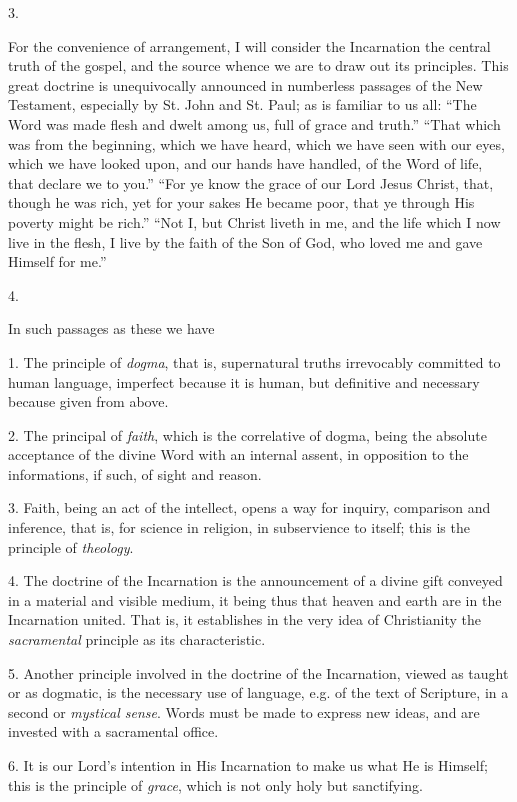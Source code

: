3.

For the convenience of arrangement, I will consider the Incarnation
the central truth of the gospel, and the source whence we are to draw
out its principles. This great doctrine is unequivocally announced in
numberless passages of the New Testament, especially by St. John and
St. Paul; as is familiar to us all: ``The Word was made flesh and
dwelt among us, full of grace and truth.'' ``That which was
from the beginning, which we have heard, which we have seen with our
eyes, which we have looked upon, and our hands have handled, of the
Word of life, that declare we to you.'' ``For ye know the
grace of our Lord Jesus Christ, that, though he was rich, yet for your
sakes He became poor, that ye through His poverty might be rich.''
``Not I, but Christ liveth in me, and the life which I now live in
the flesh, I live by the faith of the Son of God, who loved me and
gave Himself for me.''

4.

In such passages as these we have

1. The principle of \emph{dogma}, that is, supernatural truths
irrevocably committed to human language, imperfect because it is
human, but definitive and necessary because given from above.

2. The principal of \emph{faith}, which is the correlative of
dogma, being the absolute acceptance of the divine Word with an
internal assent, in opposition to the informations, if such, of sight
and reason.

3. Faith, being an act of the intellect, opens a way for inquiry,
comparison and inference, that is, for science in religion, in
subservience to itself; this is the principle of \emph{theology}.

4. The doctrine of the Incarnation is the announcement of a divine
gift conveyed in a material and visible medium, it being thus that
heaven and earth are in the Incarnation united. That is, it
establishes in the very idea of Christianity the \emph{sacramental}
principle as its characteristic.

5. Another principle involved in the doctrine of the Incarnation,
viewed as taught or as dogmatic, is the necessary use of language,
e.g. of the text of Scripture, in a second or \emph{mystical sense}.
Words must be made to express new ideas, and are invested with a
sacramental office.

6. It is our Lord's intention in His Incarnation to make us what He
is Himself; this is the principle of \emph{grace}, which is not only
holy but sanctifying.

